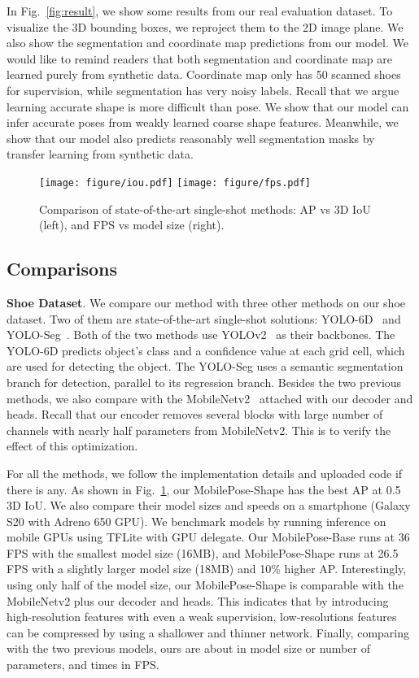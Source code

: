 \documentclass[runningheads]{llncs}
\begin{document}
In Fig.~\ref{fig:result}, we show some results from our real evaluation dataset. To visualize the 3D bounding boxes, we reproject them to the 2D image plane. We also show the segmentation and coordinate map predictions from our model. We would like to remind readers that both segmentation and coordinate map are learned purely from synthetic data. Coordinate map only has 50 scanned shoes for supervision, while segmentation has very noisy labels. Recall that we argue learning accurate shape is more difficult than pose. We show that our model can infer accurate poses from weakly learned coarse shape features. Meanwhile, we show that our model also predicts reasonably well segmentation masks by transfer learning from synthetic data.

\begin{figure}[t]
    \centering
    \texttt{[image: figure/iou.pdf]}
    \texttt{[image: figure/fps.pdf]}
    \caption{Comparison of state-of-the-art single-shot methods: AP vs 3D IoU (left), and FPS vs model size (right).}
    \label{fig:compare}
\end{figure}

\subsection{Comparisons}
\textbf{Shoe Dataset}. We compare our method with three other methods on our shoe dataset. Two of them are state-of-the-art single-shot solutions: YOLO-6D~\cite{Tekin_2018_SingleShot} and YOLO-Seg~\cite{Hu_2019_Segmentation}. Both of the two methods use YOLOv2~\cite{Redmon_2016_YOLOv2} as their backbones. The YOLO-6D predicts object's class and a confidence value at each grid cell, which are used for detecting the object. The YOLO-Seg uses a semantic segmentation branch for detection, parallel to its regression branch. Besides the two previous methods, we also compare with the MobileNetv2~\cite{Sandler_2018_MobileNetv2} attached with our decoder and heads. Recall that our encoder removes several blocks with large number of channels with nearly half parameters from MobileNetv2. This is to verify the effect of this optimization.



For all the methods, we follow the implementation details and uploaded code if there is any. As shown in Fig.~\ref{fig:compare}, our MobilePose-Shape has the best AP at 0.5 3D IoU. We also compare their model sizes and speeds on a smartphone (Galaxy S20 with Adreno 650 GPU). We benchmark models by running inference on mobile GPUs using TFLite with GPU delegate. Our MobilePose-Base runs at 36 FPS with the smallest model size (16MB), and MobilePose-Shape runs at 26.5 FPS with a slightly larger model size (18MB) and 10\% higher AP. Interestingly, using only half of the model size, our MobilePose-Shape is comparable with the MobileNetv2 plus our decoder and heads. This indicates that by introducing high-resolution features with even a weak supervision, low-resolutions features can be compressed by using a shallower and thinner network. Finally, comparing with the two previous models, ours are about  in model size or number of parameters, and  times in FPS.
\end{document}
